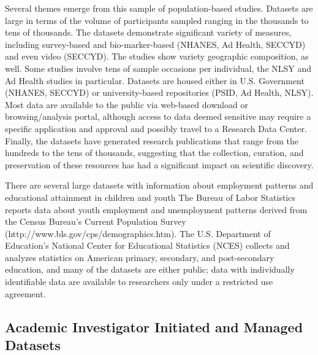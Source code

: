\documentclass[letterpaper,man,apacite]{apa6}
\begin{document}
Several themes emerge from this sample of population-based studies.
Datasets are large in terms of the volume of participants sampled ranging in the thousands to tens of thousands.
The datasets demonstrate significant variety of measures, including survey-based and bio-marker-based (NHANES, Ad Health, SECCYD) and even video (SECCYD).
The studies show variety geographic composition, as well.
Some studies involve tens of sample occasions per individual, the NLSY and Ad Health studies in particular.
Datasets are housed either in U.S. Government (NHANES, SECCYD) or university-based repositories (PSID, Ad Health, NLSY).
Most data are available to the public via web-based download or browsing/analysis portal, although access to data deemed sensitive may require a specific application and approval and possibly travel to a Research Data Center.
Finally, the datasets have generated research publications that range from the hundreds to the tens of thousands, suggesting that the collection, curation, and preservation of these resources has had a significant impact on scientific discovery.

There are several large datasets with information about employment patterns and educational attainment in children and youth
The Bureau of Labor Statistics reports data about youth employment and unemployment patterns derived from the Census Bureau's Current Population Survey (http://www.bls.gov/cps/demographics.htm).
The U.S. Department of Education's National Center for Educational Statistics (NCES) collects and analyzes statistics on American primary, secondary, and post-secondary education, and many of the datasets are either public; data with individually identifiable data are available to researchers only under a restricted use agreement.

\subsection{Academic Investigator Initiated and Managed Datasets}
\end{document}
